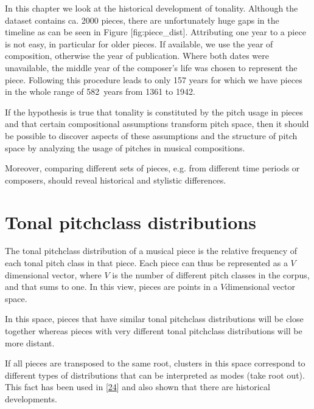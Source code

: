 \documentclass[letterpaper,10pt,english]{sphinxmanual}
\begin{document}
\sphinxAtStartPar
In this chapter we look at the historical development of tonality.
Although the dataset contains ca. 2000 pieces, there are unfortunately
huge gaps in the timeline as can be seen in Figure {[}fig:piece\_dist{]}.
Attributing one year to a piece is not easy, in particular for older
pieces. If available, we use the year of composition, otherwise the year
of publication. Where both dates were unavailable, the middle year of
the composer’s life was chosen to represent the piece. Following this
procedure leads to only 157 years for which we have pieces in the whole
range of 582 years from 1361 to 1942.

\sphinxAtStartPar
If the hypothesis is true that tonality is constituted by the pitch
usage in pieces and that certain compositional assumptions transform
pitch space, then it should be possible to discover aspects of these
assumptions and the structure of pitch space by analyzing the usage of
pitches in musical compositions.

\sphinxAtStartPar
Moreover, comparing different sets of pieces, e.g. from different time
periods or composers, should reveal historical and stylistic
differences.


\chapter{Tonal pitch\sphinxhyphen{}class distributions}
\label{\detokenize{pc_distributions:tonal-pitch-class-distributions}}\label{\detokenize{pc_distributions::doc}}
\sphinxAtStartPar
The tonal pitch\sphinxhyphen{}class distribution of a musical piece is the relative
frequency of each tonal pitch class in that piece. Each piece can thus
be represented as a \(V\)\sphinxhyphen{}dimensional vector, where \(V\) is the
number of different pitch classes in the corpus, and that sums to one.
In this view, pieces are points in a \(V\)\sphinxhyphen{}dimensional vector space.

\sphinxAtStartPar
In this space, pieces that have similar tonal pitch\sphinxhyphen{}class distributions
will be close together whereas pieces with very different tonal
pitch\sphinxhyphen{}class distributions will be more distant.

\sphinxAtStartPar
If all pieces are transposed to the same root, clusters in this space
correspond to different types of distributions that can be interpreted
as modes (take root out). This fact has been used in
{[}\hyperlink{cite.8_bibliography:id76}{24}{]}
and also shown that there are historical developments.
\end{document}
